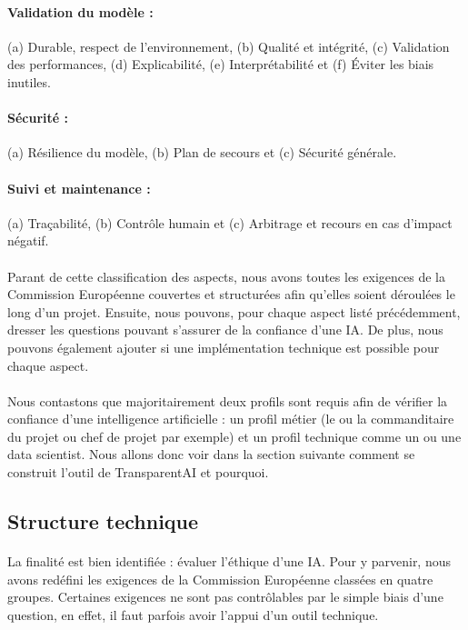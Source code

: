 \documentclass[10pt, french, a4paper]{report}
\begin{document}
\paragraph{Validation du modèle :} (a) Durable, respect de l'environnement, (b) Qualité et intégrité, (c) Validation des performances, (d) Explicabilité, (e) Interprétabilité et (f) \uppercase{é}viter les biais inutiles.

\paragraph{Sécurité :} (a) Résilience du modèle, (b) Plan de secours et (c) Sécurité générale.

\paragraph{Suivi et maintenance :} (a) Traçabilité, (b) Contrôle humain et (c) Arbitrage et recours en cas d'impact négatif.

\paragraph{}
Parant de cette classification des aspects, nous avons toutes les exigences de la Commission Européenne couvertes et structurées afin qu'elles soient déroulées le long d'un projet. Ensuite, nous pouvons, pour chaque aspect listé précédemment, dresser les questions pouvant s'assurer de la confiance d'une IA. De plus, nous pouvons également ajouter si une implémentation technique est possible pour chaque aspect. 


\paragraph{}
Nous contastons que majoritairement deux profils sont requis afin de vérifier la confiance d'une intelligence artificielle : un profil métier (le ou la commanditaire du projet ou chef de projet par exemple) et un profil technique comme un ou une data scientist. Nous allons donc voir dans la section suivante comment se construit l'outil de TransparentAI et pourquoi.

\subsection{Structure technique}

\paragraph{}
La finalité est bien identifiée : évaluer l'éthique d'une IA. Pour y parvenir, nous avons redéfini les exigences de la Commission Européenne classées en quatre groupes. Certaines exigences ne sont pas contrôlables par le simple biais d'une question, en effet, il faut parfois avoir l'appui d'un outil technique. 
\end{document}

